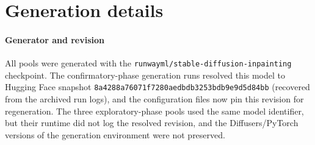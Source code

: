 \appendix
\section{Generation details}\label{app:gen}
\paragraph{Generator and revision}
All pools were generated with the \texttt{runwayml/stable-diffusion-inpainting} checkpoint. The confirmatory-phase generation runs resolved this model to Hugging Face snapshot \texttt{8a4288a76071f7280aedbdb3253bdb9e9d5d84bb} (recovered from the archived run logs), and the configuration files now pin this revision for regeneration. The three exploratory-phase pools used the same model identifier, but their runtime did not log the resolved revision, and the Diffusers/PyTorch versions of the generation environment were not preserved.
